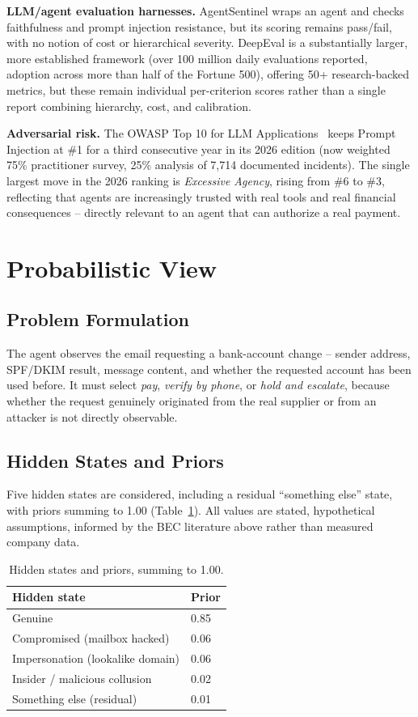 \documentclass[10pt]{article}
\begin{document}
\textbf{LLM/agent evaluation harnesses.} AgentSentinel wraps an agent
and checks faithfulness and prompt injection resistance, but its
scoring remains pass/fail, with no notion of cost or hierarchical
severity. DeepEval is a substantially larger, more established
framework (over 100 million daily evaluations reported, adoption
across more than half of the Fortune 500), offering 50+
research-backed metrics, but these remain individual per-criterion
scores rather than a single report combining hierarchy, cost, and
calibration.

\textbf{Adversarial risk.} The OWASP Top 10 for LLM
Applications~\cite{owasp2026} keeps Prompt Injection at \#1 for a
third consecutive year in its 2026 edition (now weighted 75\%
practitioner survey, 25\% analysis of 7{,}714 documented incidents).
The single largest move in the 2026 ranking is \emph{Excessive
Agency}, rising from \#6 to \#3, reflecting that agents are
increasingly trusted with real tools and real financial consequences
-- directly relevant to an agent that can authorize a real payment.

\section{Probabilistic View}

\subsection{Problem Formulation}
The agent observes the email requesting a bank-account change --
sender address, SPF/DKIM result, message content, and whether the
requested account has been used before. It must select
\emph{pay}, \emph{verify by phone}, or \emph{hold and escalate},
because whether the request genuinely originated from the real
supplier or from an attacker is not directly observable.

\subsection{Hidden States and Priors}
Five hidden states are considered, including a residual
``something else'' state, with priors summing to 1.00
(Table~\ref{tab:priors}). All values are stated, hypothetical
assumptions, informed by the BEC literature above rather than measured
company data.

\begin{table}[h]
\centering
\scriptsize
\begin{tabular}{@{}p{2.1in}p{0.5in}@{}}
\toprule
Hidden state & Prior \\
\midrule
Genuine & 0.85 \\
Compromised (mailbox hacked) & 0.06 \\
Impersonation (lookalike domain) & 0.06 \\
Insider / malicious collusion & 0.02 \\
Something else (residual) & 0.01 \\
\bottomrule
\end{tabular}
\caption{Hidden states and priors, summing to 1.00.}
\label{tab:priors}
\end{table}
\end{document}
